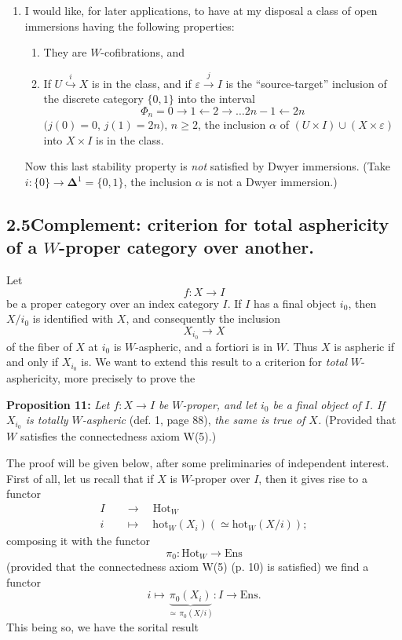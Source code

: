 \begin{enumerate}
\item[b)] I would like, for later applications, to have at my disposal a class of open immersions having the following properties:
\begin{enumerate}
\item[1°)] They are $W$-cofibrations, and
\item[2°)] If $U \overset{i}{\hookrightarrow} X$ is in the class, and if $\varepsilon \xrightarrow{j} I$ is the ``source-target'' inclusion of the discrete category $\{0,1\}$ into the interval
\[
\Phi_n = 0 \longrightarrow 1 \longleftarrow 2 \longrightarrow \dots 2n-1 \longleftarrow 2n
\]
$(j(0)=0$, $j(1)=2n)$, $n\geq 2$, the inclusion $\alpha$ of $(U\times I)\cup(X\times\varepsilon)$ into $X\times I$ is in the class.
\end{enumerate}
Now this last stability property is \textit{not} satisfied by Dwyer immersions. (Take $i : \{0\} \longrightarrow \boldsymbol{\Delta}^1 = \{0,1\}$, the inclusion $\alpha$ is not a Dwyer immersion.)
\end{enumerate}


\subsection*{2.5\quad Complement: criterion for total asphericity of a $W$-proper category over another.}

Let
\[
f : X \longrightarrow I
\]
be a proper category over an index category $I$. If $I$ has a final object $i_0$, then $X/i_0$ is identified with $X$, and consequently the inclusion
\[
X_{i_0} \longrightarrow X
\]
of the fiber of $X$ at $i_0$ is $W$-aspheric, and a fortiori is in $W$. Thus $X$ is aspheric if and only if $X_{i_0}$ is. We want to extend this result to a criterion for \textit{total} $W$-asphericity, more precisely to prove the

\textbf{Proposition 11:} \textit{Let $f : X \longrightarrow I$ be $W$-proper, and let $i_0$ be a final object of $I$. If $X_{i_0}$ is totally $W$-aspheric} (def. 1, page 88), \textit{the same is true of $X$.} (Provided that $W$ satisfies the connectedness axiom W(5).)

The proof will be given below, after some preliminaries of independent interest. First of all, let us recall that if $X$ is $W$-proper over $I$, then it gives rise to a functor
\[
\begin{aligned}
I \quad &\longrightarrow \quad \mathrm{Hot}_W\\
i \quad &\longmapsto \quad \mathrm{hot}_W(X_i)(\simeq \mathrm{hot}_W(X/i));
\end{aligned}
\]
composing it with the functor
\[
\pi_0 : \mathrm{Hot}_W \longrightarrow \mathrm{Ens}
\]
(provided that the connectedness axiom W(5) (p. 10) is satisfied)
we find a functor
\[
i \longmapsto \underbrace{\pi_0(X_i)}_{\simeq\, \pi_0(X/i)} : I \longrightarrow \mathrm{Ens}.
\]
This being so, we have the sorital result

